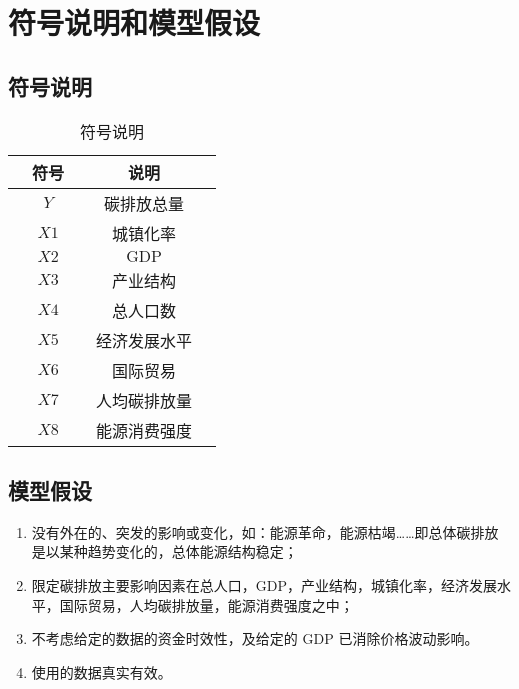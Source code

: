 \section{符号说明和模型假设}

  \subsection{符号说明}
    \begin{table}[hb]
      \centering
      \caption{符号说明}
      \begin{tabular*}{0.618\paperwidth}{@{\extracolsep{\fill}}ccccc}
        \toprule[1.5pt]
        &符号 && 说明 &\\
        \midrule[1pt]
        &$Y$ && 碳排放总量 &\\
        &$X1$ && 城镇化率 &\\
        &$X2$ && $\mathrm{GDP}$ &\\
        &$X3$ && 产业结构 &\\
        &$X4$ && 总人口数 &\\
        &$X5$ && 经济发展水平 &\\
        &$X6$ && 国际贸易 &\\
        &$X7$ && 人均碳排放量 &\\
        &$X8$ && 能源消费强度 &\\
        \bottomrule[1.5pt]
      \end{tabular*}
      \label{tab:fuhaoshuoming}
    \end{table}

  \subsection{模型假设}
    \begin{enumerate}
      \item 没有外在的、突发的影响或变化，如：能源革命，能源枯竭……即总体碳排放是以某种趋势变化的，总体能源结构稳定；
      \item 限定碳排放主要影响因素在总人口，GDP，产业结构，城镇化率，经济发展水平，国际贸易，人均碳排放量，能源消费强度之中；
      \item 不考虑给定的数据的资金时效性，及给定的 $\mathrm{GDP}$ 已消除价格波动影响。
      \item 使用的数据真实有效。
    \end{enumerate}